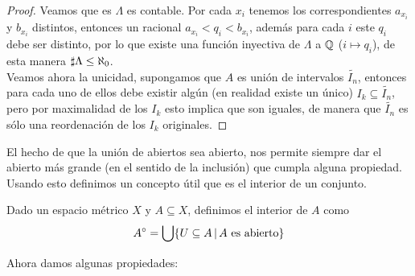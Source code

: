 \documentclass[12pt,a4paper]{book}
\begin{document}
\begin{teo}
\begin{proof}
Veamos que es $\Lambda$ es contable. Por cada $x_i$ tenemos los correspondientes $a_{x_i}$ y $b_{x_i}$ distintos, entonces un racional $a_{x_i}< q_i < b_{x_i}$, además para cada $i$ este $q_i$ debe ser distinto, por lo que existe una función inyectiva de $\Lambda$ a $\mathbb{Q}$ ($ i \mapsto q_i$), de esta manera $\sharp \Lambda \leq \a0$.\\
Veamos ahora la unicidad, supongamos que $A$ es unión de intervalos $\tilde{I_n}$, entonces para cada uno de ellos debe existir algún (en realidad existe un único) $I_k \subseteq \tilde{I_n}$, pero por maximalidad de los $I_k$ esto implica que son iguales, de manera que $\tilde{I_n}$ es sólo una reordenación de los $I_k$ originales.
\end{proof}
\end{teo}
El hecho de que la unión de abiertos sea abierto, nos permite siempre dar el abierto más grande (en el sentido de la inclusión) que cumpla alguna propiedad. Usando esto definimos un concepto útil que es el interior de un conjunto.
\begin{defi} Dado un espacio métrico $X$ y $A \subseteq X$, definimos el interior de $A$ como
$$ A^\circ = \bigcup \{ U \subseteq A \,\vert\, A \mbox{ es abierto}\}$$
\end{defi}
Ahora damos algunas propiedades:
\end{document}
